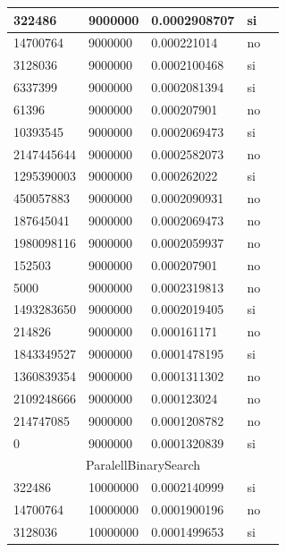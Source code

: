 \documentclass[12pt, fleqn]{article}                             %
\theoremstyle{break}                                            %
\begin{document}
\begin{longtable}{|m{5em}|m{5em}|m{10em}|m{5em}|@{}m{0pt}@{}}
            322486& 9000000  & 0.0002908707 & si &\\[1em]    \hline
            14700764& 9000000  & 0.000221014 & no &\\[1em]    \hline
            3128036& 9000000  & 0.0002100468 & si &\\[1em]    \hline
            6337399& 9000000  & 0.0002081394 & si &\\[1em]    \hline
            61396& 9000000  & 0.000207901 & no &\\[1em]    \hline
            10393545& 9000000  & 0.0002069473 & si &\\[1em]    \hline
            2147445644& 9000000  & 0.0002582073 & no &\\[1em]    \hline
            1295390003& 9000000  & 0.000262022 & si &\\[1em]    \hline
            450057883& 9000000  & 0.0002090931 & no &\\[1em]    \hline
            187645041& 9000000  & 0.0002069473 & no &\\[1em]    \hline
            1980098116& 9000000  & 0.0002059937 & no &\\[1em]    \hline
            152503& 9000000  & 0.000207901 & no &\\[1em]    \hline
            5000& 9000000  & 0.0002319813 & no &\\[1em]    \hline
            1493283650& 9000000  & 0.0002019405 & si &\\[1em]    \hline
            214826& 9000000  & 0.000161171 & no &\\[1em]    \hline
            1843349527& 9000000  & 0.0001478195 & si &\\[1em]    \hline
            1360839354& 9000000  & 0.0001311302 & no &\\[1em]    \hline
            2109248666& 9000000  & 0.000123024 & no &\\[1em]    \hline
            214747085& 9000000  & 0.0001208782 & no &\\[1em]    \hline
            0& 9000000  & 0.0001320839 & si &\\[1em]    \hline
            \multicolumn{5}{|c|}{ParalellBinarySearch}   \\          \hline
            322486& 10000000  & 0.0002140999 & si &\\[1em]    \hline
            14700764& 10000000  & 0.0001900196 & no &\\[1em]    \hline
            3128036& 10000000  & 0.0001499653 & si &\\[1em]    \hline

\end{longtable}
\end{document}
